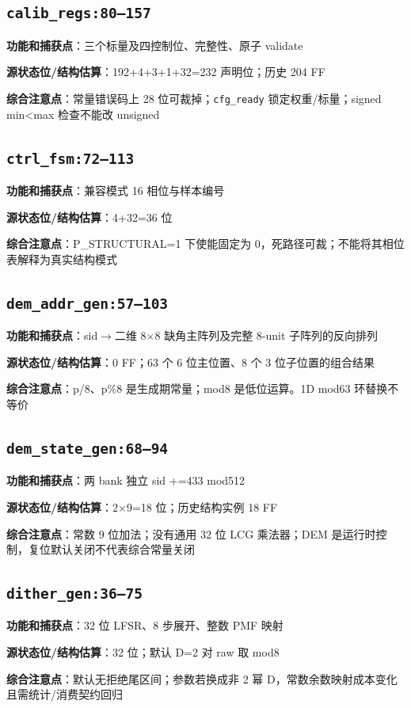 \documentclass[UTF8,fontset=fandol,10pt,a4paper,openany]{ctexrep}
\newcommand{\code}[1]{\nolinkurl{#1}}
\begin{document}
\subsection*{\code{calib_regs:80–157}}
\noindent\textbf{功能和捕获点}：三个标量及四控制位、完整性、原子 validate\par
\noindent\textbf{源状态位/结构估算}：192+4+3+1+32=232 声明位；历史 204 FF\par
\noindent\textbf{综合注意点}：常量错误码上 28 位可裁掉；\code{cfg_ready} 锁定权重/标量；signed min<max 检查不能改 unsigned\par
\subsection*{\code{ctrl_fsm:72–113}}
\noindent\textbf{功能和捕获点}：兼容模式 16 相位与样本编号\par
\noindent\textbf{源状态位/结构估算}：4+32=36 位\par
\noindent\textbf{综合注意点}：P\_STRUCTURAL=1 下使能固定为 0，死路径可裁；不能将其相位表解释为真实结构模式\par
\subsection*{\code{dem_addr_gen:57–103}}
\noindent\textbf{功能和捕获点}：sid\ensuremath{\rightarrow}二维 8\ensuremath{\times}8 缺角主阵列及完整 8-unit 子阵列的反向排列\par
\noindent\textbf{源状态位/结构估算}：0 FF；63 个 6 位主位置、8 个 3 位子位置的组合结果\par
\noindent\textbf{综合注意点}：p/8、p\%8 是生成期常量；mod8 是低位运算。1D mod63 环替换不等价\par
\subsection*{\code{dem_state_gen:68–94}}
\noindent\textbf{功能和捕获点}：两 bank 独立 sid +=433 mod512\par
\noindent\textbf{源状态位/结构估算}：2\ensuremath{\times}9=18 位；历史结构实例 18 FF\par
\noindent\textbf{综合注意点}：常数 9 位加法；没有通用 32 位 LCG 乘法器；DEM 是运行时控制，复位默认关闭不代表综合常量关闭\par
\subsection*{\code{dither_gen:36–75}}
\noindent\textbf{功能和捕获点}：32 位 LFSR、8 步展开、整数 PMF 映射\par
\noindent\textbf{源状态位/结构估算}：32 位；默认 D=2 对 raw 取 mod8\par
\noindent\textbf{综合注意点}：默认无拒绝尾区间；参数若换成非 2 幂 D，常数余数映射成本变化且需统计/消费契约回归\par
\end{document}
